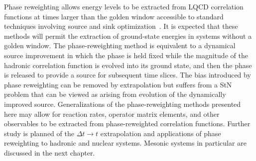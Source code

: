 Phase reweighting 
allows 
energy levels
to be extracted
from LQCD correlation functions
at times larger than the
golden window
accessible to standard techniques involving source and sink optimization~\cite{Beane:2009kya,Beane:2009gs,Beane:2010em,Detmold:2014rfa,Detmold:2014hla}.
It is expected that these methods
will permit the extraction of ground-state energies in systems
without a golden window.
The phase-reweighting method
is equivalent to a dynamical source improvement
in which the phase is held fixed while the magnitude of the hadronic correlation function
is evolved into its ground state,
and then the phase is released to provide a source for subsequent time slices.
The bias introduced by phase reweighting can be removed by extrapolation
but suffers from a StN problem
that can be viewed as arising from evolution of the dynamically improved source.
Generalizations of the phase-reweighting methods presented here
may allow for reaction rates,
operator matrix elements,
and other observables to be extracted from phase-reweighted correlation functions.
Further study is planned of the $\Delta t \rightarrow t$ extrapolation 
and applications of phase reweighting to hadronic and nuclear systems.
Mesonic systems in particular are discussed in the next chapter.



